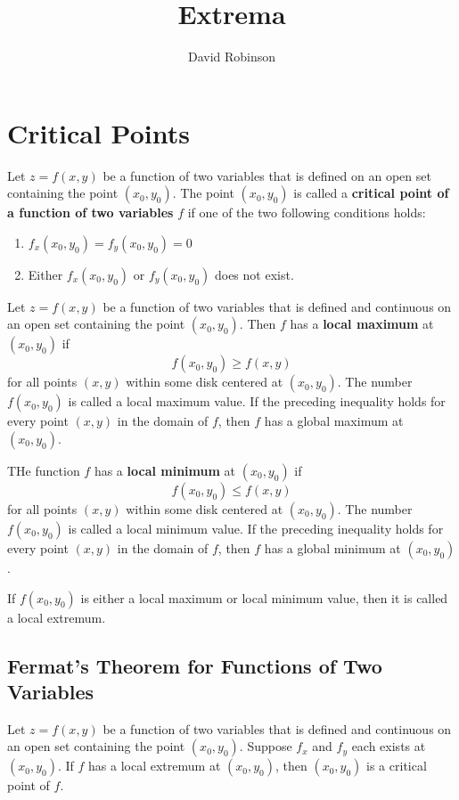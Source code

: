 \documentclass{article}
\title{Extrema}
\author{David Robinson}
\date{}
\begin{document}
\maketitle

\section*{Critical Points}

Let $z=f(x,y)$ be a function of two variables that is defined on an open set containing the point $(x_0,y_0)$. The point $(x_0,y_0)$ is called a \textbf{critical point of a function of two variables} $f$ if one of the two following conditions holds:
\begin{enumerate}
    \item $f_x(x_0,y_0)=f_y(x_0,y_0)=0$
    \item Either $f_x(x_0,y_0)$ or $f_y(x_0,y_0)$ does not exist.
\end{enumerate}

Let $z=f(x,y)$ be a function of two variables that is defined and continuous on an open set containing the point $(x_0,y_0)$. Then $f$ has a \textbf{local maximum} at $(x_0,y_0)$ if
\[f(x_0,y_0)\geq f(x,y)\]
for all points $(x,y)$ within some disk centered at $(x_0,y_0)$. The number $f(x_0,y_0)$ is called a local maximum value. If the preceding inequality holds for every point $(x,y)$ in the domain of $f$, then $f$ has a global maximum at $(x_0,y_0)$.
\vspace{1em}

THe function $f$ has a \textbf{local minimum} at $(x_0,y_0)$ if
\[f(x_0,y_0)\leq f(x,y)\]
for all points $(x,y)$ within some disk centered at $(x_0,y_0)$. The number $f(x_0,y_0)$ is called a local minimum value. If the preceding inequality holds for every point $(x,y)$ in the domain of $f$, then $f$ has a global minimum at $(x_0,y_0)$.
\vspace{1em}

If $f(x_0,y_0)$ is either a local maximum or local minimum value, then it is called a local extremum.

\subsection*{Fermat's Theorem for Functions of Two Variables}

Let $z=f(x,y)$ be a function of two variables that is defined and continuous on an open set containing the point $(x_0,y_0)$. Suppose $f_x$ and $f_y$ each exists at $(x_0,y_0)$. If $f$ has a local extremum at $(x_0,y_0)$, then $(x_0,y_0)$ is a critical point of $f$.
\end{document}
